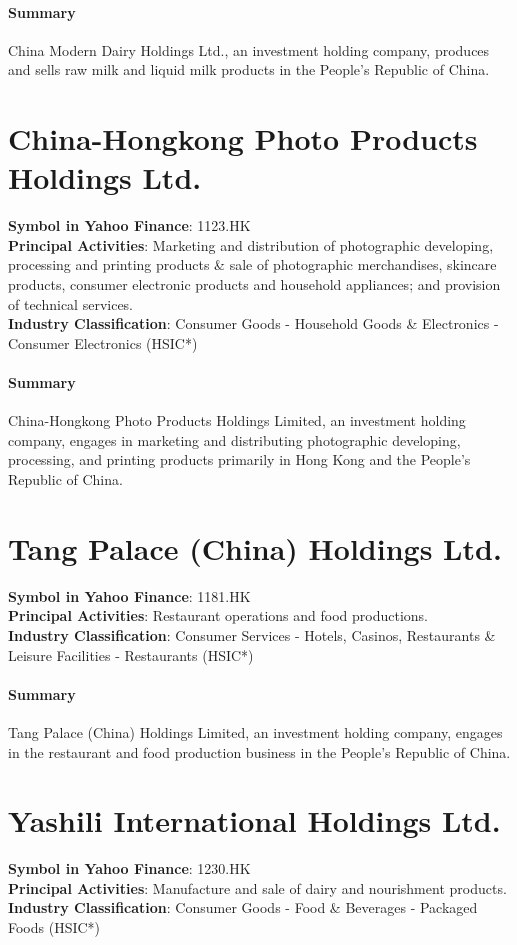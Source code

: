 \paragraph{Summary}
China Modern Dairy Holdings Ltd., an investment holding company, produces and sells raw milk and liquid milk products in the People's Republic of China.


\section{China-Hongkong Photo Products Holdings Ltd.}
\textbf{Symbol in Yahoo Finance}: 1123.HK\\
\textbf{Principal Activities}: Marketing and distribution of photographic developing, processing and printing products \& sale of photographic merchandises, skincare products, consumer electronic products and household appliances; and provision of technical services.\\
\textbf{Industry Classification}: Consumer Goods - Household Goods \& Electronics - Consumer Electronics (HSIC*)
\paragraph{Summary}
China-Hongkong Photo Products Holdings Limited, an investment holding company, engages in marketing and distributing photographic developing, processing, and printing products primarily in Hong Kong and the People's Republic of China.


\section{Tang Palace (China) Holdings Ltd.}
\textbf{Symbol in Yahoo Finance}: 1181.HK\\
\textbf{Principal Activities}: Restaurant operations and food productions.\\
\textbf{Industry Classification}: Consumer Services - Hotels, Casinos, Restaurants \& Leisure Facilities - Restaurants (HSIC*)
\paragraph{Summary}
Tang Palace (China) Holdings Limited, an investment holding company, engages in the restaurant and food production business in the People's Republic of China.


\section{Yashili International Holdings Ltd.}
\textbf{Symbol in Yahoo Finance}: 1230.HK\\
\textbf{Principal Activities}: Manufacture and sale of dairy and nourishment products.\\
\textbf{Industry Classification}: Consumer Goods - Food \& Beverages - Packaged Foods (HSIC*)
